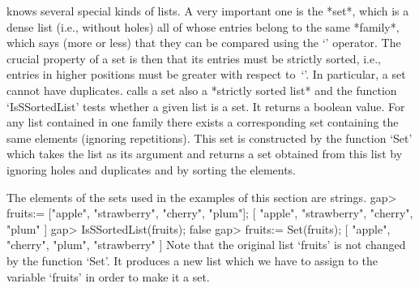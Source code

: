
%
{\GAP} knows several special kinds of lists. A  very important one is the
*set*, which is a  dense list (i.e., without  holes) all of whose entries
belong to the same  *family*, which says (more or  less) that they can be
compared using the `\<'  operator. The crucial property of  a set is then
that   its  entries must  be strictly   sorted, i.e.,   entries in higher
positions   must be greater  with respect  to~`\<'. In  particular, a set
cannot have duplicates. {\GAP} calls a  set also a *strictly sorted list*
and the function `IsSSortedList' tests whether a given  list is a set. It
returns  a boolean value.  For any  list contained  in  one family  there
exists  a    corresponding set containing  the   same  elements (ignoring
repetitions).
This set is constructed by the function `Set' which takes the
list as  its argument   and returns a   set  obtained from this   list by
ignoring holes and duplicates and by sorting the elements.

The  elements  of  the  sets used  in  the  examples of this  section are
strings.
\beginexample
    gap> fruits:= ["apple", "strawberry", "cherry", "plum"];
    [ "apple", "strawberry", "cherry", "plum" ]
    gap> IsSSortedList(fruits);
    false
    gap> fruits:= Set(fruits);
    [ "apple", "cherry", "plum", "strawberry" ] 
\endexample
Note  that the  original list `fruits'  is not  changed  by the  function
`Set'.
It produces a new list which we have to assign to the variable `fruits'
in order to make it a set.

